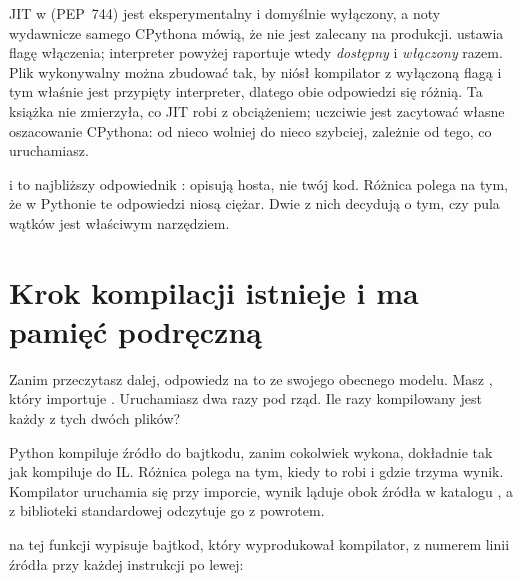 \begin{versionbox}
JIT w \pyver{} (PEP~744) jest eksperymentalny i domyślnie wyłączony, a noty
wydawnicze samego CPythona mówią, że nie jest zalecany na produkcji.
 ustawia flagę włączenia; interpreter powyżej raportuje
wtedy \emph{dostępny} i \emph{włączony} razem. Plik wykonywalny można zbudować
tak, by niósł kompilator z wyłączoną flagą \dash{} i tym właśnie jest przypięty
interpreter, dlatego obie odpowiedzi się różnią. Ta książka nie zmierzyła, co
JIT robi z obciążeniem; uczciwie jest zacytować własne oszacowanie CPythona:
od nieco wolniej do nieco szybciej, zależnie od tego, co uruchamiasz.
\end{versionbox}

\begin{csbox}
 i  to
najbliższy odpowiednik : opisują
hosta, nie twój kod. Różnica polega na tym, że w Pythonie te odpowiedzi
niosą ciężar. Dwie z nich decydują o tym, czy pula wątków jest właściwym
narzędziem.
\end{csbox}

\section{Krok kompilacji istnieje i ma pamięć podręczną}
\label{sec:ch01-bytecode}

\noindent
Zanim przeczytasz dalej, odpowiedz na to ze swojego obecnego modelu. Masz
, który importuje . Uruchamiasz  dwa razy pod rząd. Ile razy kompilowany jest każdy z tych dwóch
plików?

\medskip
\noindent
Python kompiluje źródło do bajtkodu, zanim cokolwiek wykona, dokładnie tak
jak  kompiluje do IL. Różnica polega na tym, kiedy to robi i gdzie
trzyma wynik. Kompilator uruchamia się przy imporcie, wynik ląduje obok
źródła w katalogu , a  z biblioteki
standardowej odczytuje go z powrotem.


\noindent
{} na tej funkcji wypisuje bajtkod, który wyprodukował
kompilator, z numerem linii źródła przy każdej instrukcji po lewej:


